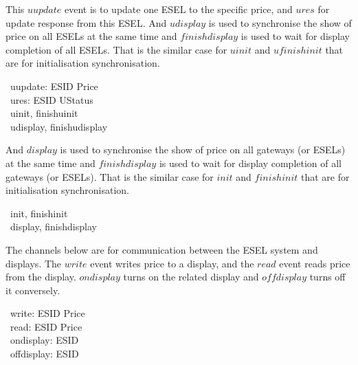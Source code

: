 %

This $uupdate$ event is to update one ESEL to the specific price, and $ures$ for update response from this ESEL.
And $udisplay$ is used to synchronise the show of price on all ESELs at the same time and $finishdisplay$ is used to wait for display completion of all ESELs. That is the similar case for $uinit$ and $ufinishinit$ that are for initialisation synchronisation. 
\begin{circus}
	\circchannel\ uupdate: ESID \cross Price \\
	\circchannel\ ures: ESID \cross UStatus \\
	\circchannel\ uinit, finishuinit\\
	\circchannel\ udisplay, finishudisplay
\end{circus}

And $display$ is used to synchronise the show of price on all gateways (or ESELs) at the same time and $finishdisplay$ is used to wait for display completion of all gateways (or ESELs). That is the similar case for $init$ and $finishinit$ that are for initialisation synchronisation. 
\begin{circus}
	\circchannel\ init, finishinit \\
	\circchannel\ display, finishdisplay
\end{circus}

The channels below are for communication between the ESEL system and displays. The $write$ event writes price to a display, and the $read$ event reads price from the display. $ondisplay$ turns on the related display and $offdisplay$ turns off it conversely.
\begin{circus}
	\circchannel\ write: ESID \cross Price \\
	\circchannel\ read: ESID \cross Price \\
	\circchannel\ ondisplay: ESID \\
	\circchannel\ offdisplay: ESID 
\end{circus}
